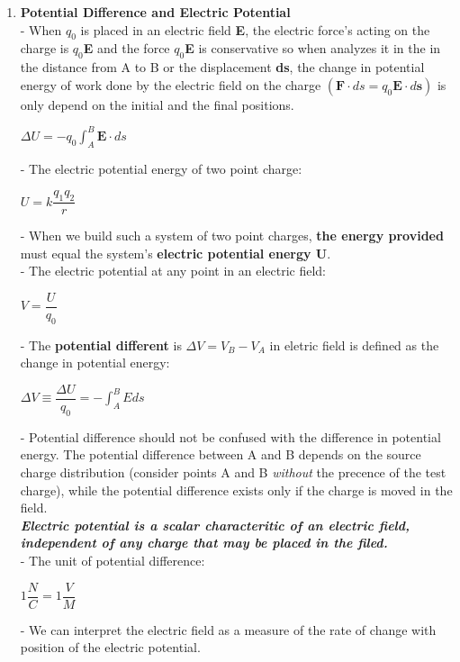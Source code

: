 \documentclass[10pt]{article}
\begin{document}
\begin{enumerate}
	\item \textbf{Potential Difference and Electric Potential}\\	
	- When $q_{0}$ is placed in an electric field \textbf{E}, the electric force's acting on the charge is $q_{0}$\textbf{E} and the force $q_{0}$\textbf{E} is conservative so when analyzes it in the in the distance from A to B or the displacement \textbf{ds}, the change in potential energy of work done by the electric field on the charge $(\textbf{F} \cdot ds = q_{0} \textbf{E} \cdot d \textbf{s})$ is only depend on the initial and the final positions.
	\begin{mybox}
	\begin{center}
	$\Delta U = -q_0 \displaystyle \int_{A}^{B} \textbf{E} \cdot ds$
	\end{center}
	\end{mybox}
	- The electric potential energy of two point charge:
	\begin{mybox}
	\begin{center}
	$U = k \dfrac{q_1q_2}{r}$
	\end{center}
	\end{mybox}
	- When we build such a system of two point  charges, \textbf{the energy provided} must equal the system's \textbf{electric potential energy U}.\\
	- The electric potential at any point in an electric field:
	\begin{mybox}
	\begin{center}
	$V = \dfrac{U}{q_0}$
	\end{center}
	\end{mybox}
	- The \textbf{potential different} is $\Delta V = V_B -V_A$ in eletric field is defined as the change in potential energy:
	\begin{mybox}
	\begin{center}
	$\Delta V \equiv \dfrac{\Delta U}{q_0} = - \displaystyle \int_{A}^{B} E ds$
	\end{center}
	\end{mybox}
	- Potential difference should not be confused with the difference in potential energy. The potential difference between A and B depends on the source charge distribution (consider points A and B \textit{without} the precence of the test charge), while the potential difference exists only if the charge is moved in the field.\\
	\textbf{\textit{Electric potential is a scalar characteritic of an electric field, independent of any charge that may be placed in the filed.}}\\	
	- The unit of potential difference:
	\begin{center}
	$1 \dfrac{N}{C} = 1 \dfrac{V}{M}$
	\end{center}
	- We can interpret the electric field as a measure of the rate of change with position of the electric potential. 
\end{enumerate}
\end{document}
